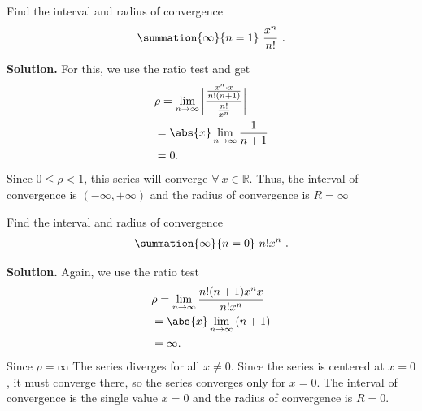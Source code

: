 \documentclass{report}
\begin{document}
    \pagebreak \bigbreak \noindent 
    \begin{eg}
        Find the interval and radius of convergence
        \begin{align*}
            \summation{\infty}{n=1}\ \frac{x^{n}}{n!}\ 
        .\end{align*}
    \end{eg}
    \bigbreak \noindent 
    \textbf{Solution.} For this, we use the ratio test and get
    \begin{align*}
        &\rho = \lim\limits_{n \to \infty}{\bigg\lvert \frac{\frac{x^{n}\cdot x}{n!(n+1)}}{\frac{n!}{x^{n}}} \bigg\rvert} \\
        &=\abs{x}\lim\limits_{n \to \infty}{\frac{1}{n+1}} \\
        &=0
    .\end{align*}
    \bigbreak \noindent 
    Since $ 0 \leq \rho  < 1$, this series will converge $\forall\ x \in \mathbb{R} $. Thus, the interval of convergence is $(-\infty,+\infty) $ and the radius of convergence is $R = \infty $

    \bigbreak \noindent 
    \begin{eg}
         Find the interval and radius of convergence
         \begin{align*}
             \summation{\infty}{n=0}\ n!x^{n}\ 
         .\end{align*}
    \end{eg}
    \bigbreak \noindent 
    \textbf{Solution.} Again, we use the ratio test
    \begin{align*}
        &\rho = \lim\limits_{n \to \infty}{\frac{n!(n+1)x^{n}x}{n!x^{n}}} \\
        &=\abs{x}\lim\limits_{n \to \infty}{(n+1)} \\
        &=\infty
    .\end{align*}
    \bigbreak \noindent 
    Since $\rho = \infty $ The series diverges for all \( x \neq 0 \). Since the series is centered at \( x = 0 \), it must converge there, so the series converges only for \( x = 0 \). The interval of convergence is the single value \( x = 0 \) and the radius of convergence is \( R = 0 \).
\end{document}
